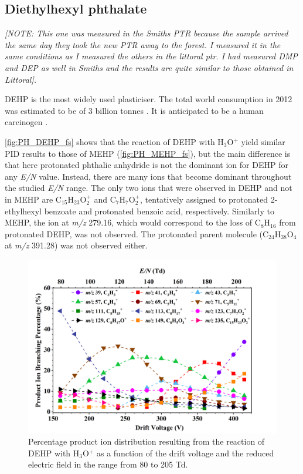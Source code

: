 \subsection{Diethylhexyl phthalate}


\textit{[NOTE: This one was measured in the Smiths PTR because the sample arrived the same day they took the new PTR away to the forest. I measured it in the same conditions as I measured the others in the littoral ptr. I had measured DMP and  DEP as well in Smiths and the results are quite similar to those obtained in Littoral].}


DEHP is the most widely used plasticiser. The total world consumption in 2012 was estimated to be of 3 billion tonnes \cite{doi:10.1002/14356007.a20_181.pub2}.
It is anticipated to be a human carcinogen \cite{us201614th}.



\autoref{fig:PH_DEHP_fs} shows that the reaction of DEHP with H$_3$O$^+$ yield similar PID results to those of MEHP (\autoref{fig:PH_MEHP_fs}), but the main difference is that here protonated phthalic anhydride is not the dominant ion for DEHP for any \textit{E/N} value. Instead, there are many ions that become dominant throughout the studied \textit{E/N} range.
The only two ions that were observed in DEHP and not in MEHP are  C$_{15}$H$_{23}$O$_2^+$
and C$_7$H$_{7}$O$_2^+$, tentatively assigned to 
protonated 2-ethylhexyl benzoate  and protonated benzoic acid, respectively.
Similarly to MEHP, the ion at \textit{m/z} 279.16, which would correspond to the loss of C$_8$H$_{16}$ from protonated DEHP, was not observed.
The protonated parent molecule (C$_{24}$H$_{38}$O$_{4}$ at \textit{m/z} 391.28) was not observed either.



\begin{figure}[htbp]
\centering
\includegraphics[height=0.4\textheight]{pics/DEHP-BR.png}
\caption{Percentage product ion distribution  resulting from the reaction of DEHP with H$_3$O$^+$ as a function of the drift voltage and the reduced electric field in the range from 80 to 205 Td.}
\label{fig:PH_DEHP_fs}
\end{figure}







